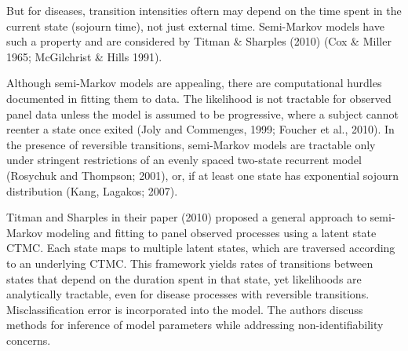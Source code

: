 \documentclass{uwstat572}
\begin{document}
But for diseases, transition intensities oftern may depend on the time spent in the current state (sojourn time), not just external time. Semi-Markov models have such a property and are considered by Titman \& Sharples (2010) (Cox \& Miller 1965; McGilchrist \& Hills 1991).

Although semi-Markov models are appealing, there are computational hurdles documented in fitting them to data. The likelihood is not tractable for observed panel data unless the model is assumed to be progressive, where a subject cannot reenter a state once exited (Joly and Commenges, 1999; Foucher et al., 2010). In the presence of reversible transitions, semi-Markov models are tractable only under stringent restrictions of an evenly spaced two-state recurrent model (Rosychuk and Thompson; 2001), or, if at least one state has exponential sojourn distribution (Kang, Lagakos; 2007).

Titman and Sharples in their paper (2010) proposed a general approach to semi-Markov modeling and fitting to panel observed processes using a latent state CTMC. Each state maps to multiple latent states, which are traversed according to an underlying CTMC. This framework yields rates of transitions between states that depend on the duration spent in that state, yet likelihoods are analytically tractable, even for disease processes with reversible transitions. Misclassification error is incorporated into the model. The authors discuss methods for inference of model parameters while addressing non-identifiability concerns.
\end{document}

